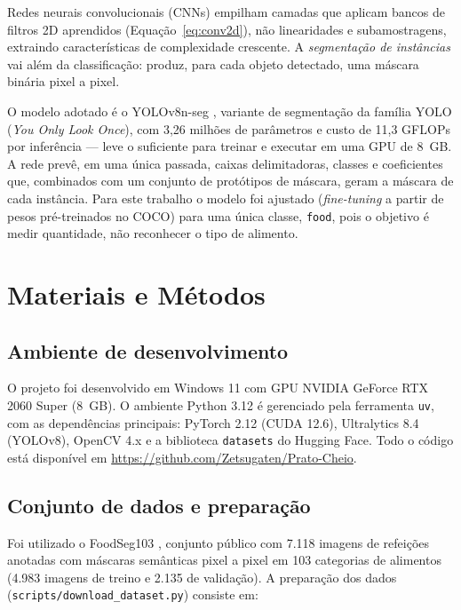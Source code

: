 \documentclass[12pt,a4paper]{article}
\begin{document}
Redes neurais convolucionais (CNNs) empilham camadas que aplicam bancos de filtros 2D
aprendidos (Equação~\eqref{eq:conv2d}), não linearidades e subamostragens, extraindo
características de complexidade crescente. A \emph{segmentação de instâncias} vai além da
classificação: produz, para cada objeto detectado, uma máscara binária pixel a pixel.

O modelo adotado é o YOLOv8n-seg \cite{yolov8}, variante de segmentação da família YOLO
(\emph{You Only Look Once}), com 3,26 milhões de parâmetros e custo de 11,3 GFLOPs por
inferência --- leve o suficiente para treinar e executar em uma GPU de 8~GB. A rede prevê,
em uma única passada, caixas delimitadoras, classes e coeficientes que, combinados com um
conjunto de protótipos de máscara, geram a máscara de cada instância. Para este trabalho o
modelo foi ajustado (\emph{fine-tuning} a partir de pesos pré-treinados no COCO) para uma
única classe, \texttt{food}, pois o objetivo é medir quantidade, não reconhecer o tipo de
alimento.

\section{Materiais e Métodos}

\subsection{Ambiente de desenvolvimento}

O projeto foi desenvolvido em Windows 11 com GPU NVIDIA GeForce RTX 2060 Super (8~GB). O
ambiente Python 3.12 é gerenciado pela ferramenta \texttt{uv}, com as dependências principais:
PyTorch 2.12 (CUDA 12.6), Ultralytics 8.4 (YOLOv8), OpenCV 4.x e a biblioteca
\texttt{datasets} do Hugging Face. Todo o código está disponível em
\url{https://github.com/Zetsugaten/Prato-Cheio}.

\subsection{Conjunto de dados e preparação}

Foi utilizado o FoodSeg103 \cite{foodseg103}, conjunto público com 7.118 imagens de refeições
anotadas com máscaras semânticas pixel a pixel em 103 categorias de alimentos (4.983 imagens
de treino e 2.135 de validação). A preparação dos dados
(\texttt{scripts/download\_dataset.py}) consiste em:
\end{document}
